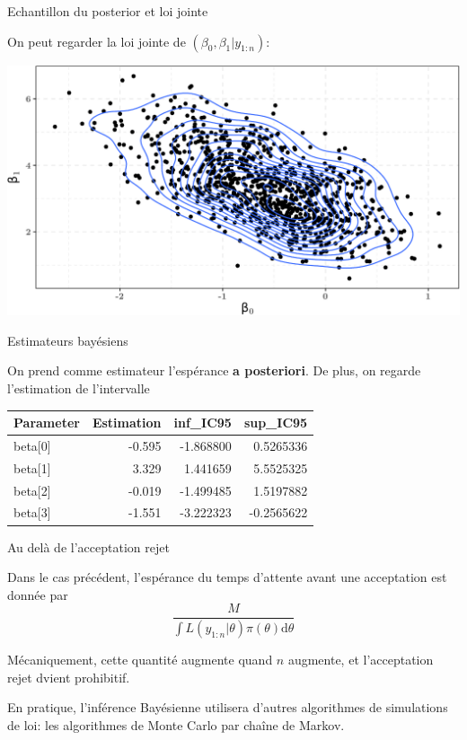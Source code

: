 \documentclass[9pt,ignorenonframetext,]{beamer}
\begin{document}
\begin{frame}{Echantillon du posterior et loi jointe}
\protect\hypertarget{echantillon-du-posterior-et-loi-jointe}{}

On peut regarder la loi jointe de \((\beta_0,\beta_1 \vert y_{1:n})\):

\includegraphics{diapos_inference_bayesienne_files/figure-beamer/loi_jointe_beta0_beta1-1.pdf}

\end{frame}

\begin{frame}{Estimateurs bayésiens}
\protect\hypertarget{estimateurs-bayuxe9siens-3}{}

On prend comme estimateur l'espérance \textbf{a posteriori}. De plus, on
regarde l'estimation de l'intervalle

\begin{longtable}[]{@{}lrrr@{}}
\toprule
Parameter & Estimation & inf\_IC95 & sup\_IC95\tabularnewline
\midrule
\endhead
beta{[}0{]} & -0.595 & -1.868800 & 0.5265336\tabularnewline
beta{[}1{]} & 3.329 & 1.441659 & 5.5525325\tabularnewline
beta{[}2{]} & -0.019 & -1.499485 & 1.5197882\tabularnewline
beta{[}3{]} & -1.551 & -3.222323 & -0.2565622\tabularnewline
\bottomrule
\end{longtable}

\end{frame}

\begin{frame}{Au delà de l'acceptation rejet}
\protect\hypertarget{au-deluxe0-de-lacceptation-rejet}{}

Dans le cas précédent, l'espérance du temps d'attente avant une
acceptation est donnée par
\[\frac{M}{\int L(y_{1:n}\vert \theta)\pi(\theta) \text{d}\theta}\]

\pause

Mécaniquement, cette quantité augmente quand \(n\) augmente, et
l'acceptation rejet dvient prohibitif.

En pratique, l'inférence Bayésienne utilisera d'autres algorithmes de
simulations de loi: les algorithmes de Monte Carlo par chaîne de Markov.

\end{frame}
\end{document}
